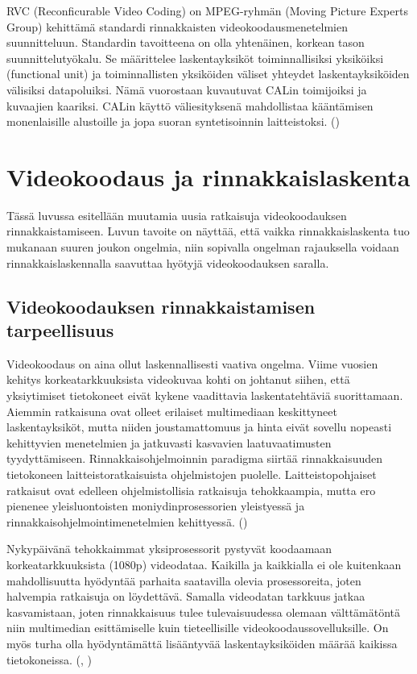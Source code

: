 RVC (Reconficurable Video Coding) on MPEG-ryhmän (Moving Picture Experts
Group) kehittämä standardi rinnakkaisten videokoodausmenetelmien suunnitteluun.
Standardin tavoitteena on olla yhtenäinen, korkean tason suunnittelutyökalu.
Se määrittelee laskentayksiköt toiminnallisiksi yksiköiksi (functional unit)
ja toiminnallisten yksiköiden väliset yhteydet laskentayksiköiden välisiksi
datapoluiksi. Nämä vuorostaan kuvautuvat CALin toimijoiksi ja kuvaajien
kaariksi. CALin käyttö väliesityksenä mahdollistaa kääntämisen monenlaisille
alustoille ja jopa suoran syntetisoinnin laitteistoksi. (\citealt{rvc})

\newpage

\section{Videokoodaus ja rinnakkaislaskenta}

Tässä luvussa esitellään muutamia uusia ratkaisuja videokoodauksen
rinnakkaistamiseen. Luvun tavoite on näyttää, että vaikka rinnakkaislaskenta
tuo mukanaan suuren joukon ongelmia, niin sopivalla ongelman rajauksella
voidaan rinnakkaislaskennalla saavuttaa hyötyjä videokoodauksen saralla.

\subsection{Videokoodauksen rinnakkaistamisen tarpeellisuus}

Videokoodaus on aina ollut laskennallisesti vaativa ongelma. Viime vuosien
kehitys korkeatarkkuuksista videokuvaa kohti on johtanut siihen, että
yksiytimiset tietokoneet eivät kykene vaadittavia laskentatehtäviä suorittamaan.
Aiemmin ratkaisuna ovat olleet erilaiset multimediaan keskittyneet
laskentayksiköt, mutta niiden joustamattomuus ja hinta eivät sovellu nopeasti
kehittyvien menetelmien ja jatkuvasti kasvavien laatuvaatimusten tyydyttämiseen.
Rinnakkaisohjelmoinnin paradigma siirtää rinnakkaisuuden tietokoneen
laitteistoratkaisuista ohjelmistojen puolelle. Laitteistopohjaiset ratkaisut
ovat edelleen ohjelmistollisia ratkaisuja tehokkaampia, mutta ero pienenee
yleisluontoisten moniydinprosessorien yleistyessä ja
rinnakkaisohjelmointimenetelmien kehittyessä. (\citealt{choi})

Nykypäivänä tehokkaimmat yksiprosessorit pystyvät koodaamaan
korkeatarkkuuksista (1080p) videodataa. Kaikilla ja kaikkialla ei ole
kuitenkaan mahdollisuutta hyödyntää parhaita saatavilla olevia prosessoreita,
joten halvempia ratkaisuja on löydettävä. Samalla videodatan tarkkuus jatkaa
kasvamistaan, joten rinnakkaisuus tulee tulevaisuudessa olemaan välttämätöntä
niin multimedian esittämiselle kuin tieteellisille videokoodaussovelluksille.
On myös turha olla hyödyntämättä lisääntyvää laskentayksiköiden määrää kaikissa
tietokoneissa. (\citealt{chi}, \citealt{xu})

